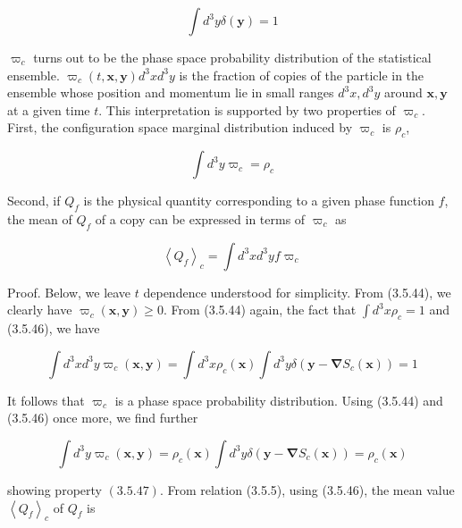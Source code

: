 \documentclass{article}
\begin{document}
\begin{equation*}
\int d^{3} y \delta(\boldsymbol{y})=1 \tag{3.5.46}
\end{equation*}
 
$\varpi_{c}$ turns out to be the phase space probability distribution of the statistical ensemble. $\varpi_{c}(t, \boldsymbol{x}, \boldsymbol{y}) d^{3} x d^{3} y$ is the fraction of copies of the particle in the ensemble whose position and momentum lie in small ranges $d^{3} x, d^{3} y$ around $\boldsymbol{x}, \boldsymbol{y}$ at a given time $t$. This interpretation is supported by two properties of $\varpi_{c}$. First, the configuration space marginal distribution induced by $\varpi_{c}$ is $\rho_{c}$,
 
\begin{equation*}
\int d^{3} y \varpi_{c}=\rho_{c} \tag{3.5.47}
\end{equation*}
 

Second, if $Q_{f}$ is the physical quantity corresponding to a given phase function $f$, the mean of $Q_{f}$ of a copy can be expressed in terms of $\varpi_{c}$ as
 
\begin{equation*}
\left\langle Q_{f}\right\rangle_{c}=\int d^{3} x d^{3} y f \varpi_{c} \tag{3.5.48}
\end{equation*}
 

Proof. Below, we leave $t$ dependence understood for simplicity. From (3.5.44), we clearly have $\varpi_{c}(\boldsymbol{x}, \boldsymbol{y}) \geq 0$. From (3.5.44) again, the fact that $\int d^{3} x \rho_{c}=1$ and (3.5.46), we have
 
\begin{equation*}
\int d^{3} x d^{3} y \varpi_{c}(\boldsymbol{x}, \boldsymbol{y})=\int d^{3} x \rho_{c}(\boldsymbol{x}) \int d^{3} y \delta\left(\boldsymbol{y}-\boldsymbol{\nabla} S_{c}(\boldsymbol{x})\right)=1 \tag{3.5.49}
\end{equation*}
 

It follows that $\varpi_{c}$ is a phase space probability distribution. Using (3.5.44) and (3.5.46) once more, we find further
 
\begin{equation*}
\int d^{3} y \varpi_{c}(\boldsymbol{x}, \boldsymbol{y})=\rho_{c}(\boldsymbol{x}) \int d^{3} y \delta\left(\boldsymbol{y}-\boldsymbol{\nabla} S_{c}(\boldsymbol{x})\right)=\rho_{c}(\boldsymbol{x}) \tag{3.5.50}
\end{equation*}
 
showing property $(3.5 .47)$.
From relation (3.5.5), using (3.5.46), the mean value $\left\langle Q_{f}\right\rangle_{c}$ of $Q_{f}$ is
 
\end{document}
